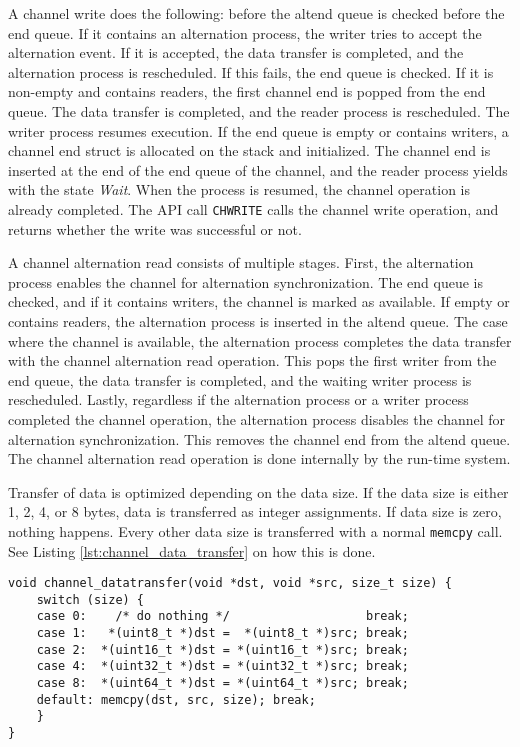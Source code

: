 A channel write does the following: before the altend queue is checked before the end queue. If it contains an alternation process, the writer tries to accept the alternation event. If it is accepted, the data transfer is completed, and the alternation process is rescheduled. If this fails, the end queue is checked. If it is non\hyp{}empty and contains readers, the first channel end is popped from the end queue. The data transfer is completed, and the reader process is rescheduled. The writer process resumes execution. If the end queue is empty or contains writers, a channel end struct is allocated on the stack and initialized. The channel end is inserted at the end of the end queue of the channel, and the reader process yields with the state \textit{Wait}. When the process is resumed, the channel operation is already completed. The API call \texttt{CHWRITE} calls the channel write operation, and returns whether the write was successful or not. 

A channel alternation read consists of multiple stages. First, the alternation process enables the channel for alternation synchronization. The end queue is checked, and if it contains writers, the channel is marked as available. If empty or contains readers, the alternation process is inserted in the altend queue. The case where the channel is available, the alternation process completes the data transfer with the channel alternation read operation. This pops the first writer from the end queue, the data transfer is completed, and the waiting writer process is rescheduled. Lastly, regardless if the alternation process or a writer process completed the channel operation, the alternation process disables the channel for alternation synchronization. This removes the channel end from the altend queue. The channel alternation read operation is done internally by the run\hyp{}time system.

Transfer of data is optimized depending on the data size. If the data size is either 1, 2, 4, or 8 bytes, data is transferred as integer assignments. If data size is zero, nothing happens. Every other data size is transferred with a normal \texttt{memcpy} call. See Listing \ref{lst:channel_data_transfer} on how this is done.

\begin{lstlisting}[caption={Channel data transfer},style={CustomC},label={lst:channel_data_transfer}]
void channel_datatransfer(void *dst, void *src, size_t size) {
    switch (size) {
    case 0:    /* do nothing */                   break;
    case 1:   *(uint8_t *)dst =  *(uint8_t *)src; break;
    case 2:  *(uint16_t *)dst = *(uint16_t *)src; break;
    case 4:  *(uint32_t *)dst = *(uint32_t *)src; break;
    case 8:  *(uint64_t *)dst = *(uint64_t *)src; break;
    default: memcpy(dst, src, size); break;
    }
}
\end{lstlisting}

